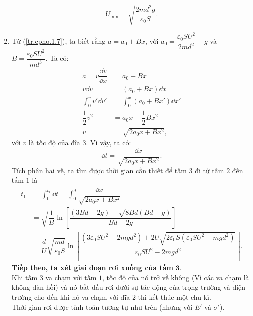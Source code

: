 \begin{loigiai}
\begin{enumerate}[1)]
        \[U_{\min}=\sqrt{\dfrac{2md^2g}{\varepsilon_0S}}.\tag{8}\label{tr.cpho.1.8}\]
        \item Từ (\ref{tr.cpho.1.7}), ta biết rằng $a=a_0+Bx$, với $a_0=\dfrac{\varepsilon_0SU^2}{2md^2}-g$ và $B=\dfrac{\varepsilon_0SU^2}{md^3}.$
        Ta có:
        \[\begin{aligned}
            a=v\dfrac{\dd v}{\dd x} &= a_0+Bx\\
            v \dd v &=\left(a_0+Bx\right)\dd x\\
            \int_0^v {v'\dd v'} &= \int_0^x {\left( {{a_0} + Bx'} \right)\dd x' }\\
            \dfrac{1}{2}v^2 &=a_0x +\dfrac{1}{2}Bx^2\\
            v&=\sqrt{2a_0x+Bx^2},
        \end{aligned}\]
        với $v$ là tốc độ của đĩa $3$. Vì vậy, ta có:
        \[\dd t=\dfrac{\dd x}{\sqrt{2a_0x+Bx^2}}. \tag{9} \label{tr.cpho.1.9}\]
        Tích phân hai vế, ta tìm được thời gian cần thiết để tấm $3$ đi từ tấm $2$ đến tấm $1$ là
        \[\begin{aligned}
            t_1&=\int_0^{{t_1}}{\dd t}=\int_0^d{\dfrac{\dd x}{\sqrt{2a_0x+Bx^2}}}\\
            &=\sqrt{\dfrac{1}{B}}\ln\left[\dfrac{\left(3Bd-2g\right)+\sqrt{8Bd\left(Bd-g\right)}}{Bd-2g}\right]\\
            &=\dfrac{d}{U} \sqrt{\dfrac{md}{\varepsilon_0 S}} \ln\left[\dfrac{\left(3\varepsilon_0SU^2-2mgd^2\right)+2U\sqrt{2\varepsilon_0S\left(\varepsilon_0SU^2-mgd^2\right)}}{\varepsilon_0SU^2-2mgd^2}\right].
        \end{aligned}\]
        \textbf{Tiếp theo, ta xét giai đoạn rơi xuống của tấm }$\mathbf{3}$.\\
        Khi tấm $3$ va chạm với tấm $1$, tốc độ của nó trở về không (Vì các va chạm là không đàn hồi) và nó bắt đầu rơi dưới sự tác động của trọng trường và điện trường cho đến khi nó va chạm với đĩa $2$ thì kết thúc một chu kì. 
        \\ Thời gian rơi được tính toán tương tự như trên (nhưng với $E'$ và $\sigma'$).
        \begin{center}
            \tikzset{
            pattern size/.store in=\mcSize, 
            pattern size = 5pt,
            pattern thickness/.store in=\mcThickness, 
            pattern thickness = 0.3pt,
            pattern radius/.store in=\mcRadius, 
            pattern radius = 1pt}
            \makeatletter
            \makeatother
            

\end{center}
\end{enumerate}
\end{loigiai}
